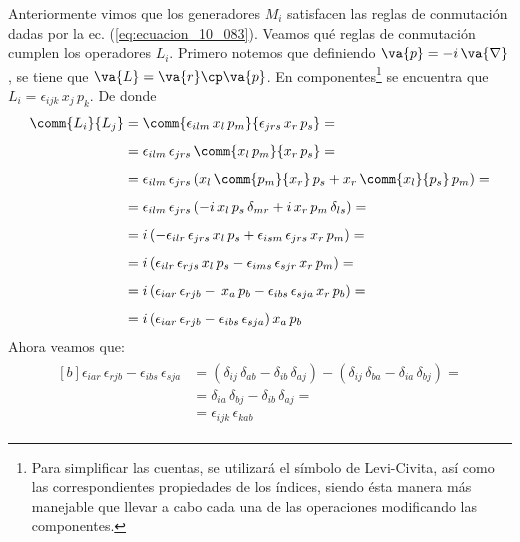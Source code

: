Anteriormente vimos que los generadores $M_{i}$ satisfacen las reglas de conmutación dadas por la ec. (\ref{eq:ecuacion_10_083}). Veamos qué reglas de conmutación cumplen los operadores $L_{i}$. Primero notemos que definiendo $\va{p} = - i \, \va{\nabla}$, se tiene que $\va{L} = \va{r} \cp \va{p}$. En componentes\footnote{Para simplificar las cuentas, se utilizará el símbolo de Levi-Civita, así como las correspondientes propiedades de los índices, siendo ésta manera más manejable que llevar a cabo cada una de las operaciones modificando las componentes.} se encuentra que $L_{i} = \epsilon_{ijk} \, x_{j} \, p_{k}$. De donde
\begin{align}
\begin{aligned}[b]
\comm{L_{i}}{L_{j}} &= \comm{\epsilon_{ilm} \, x_{l} \, p_{m}}{\epsilon_{jrs} \, x_{r} \, p_{s}} = \\[0.5em]
&= \epsilon_{ilm} \, \epsilon_{jrs} \, \comm{x_{l} \, p_{m}}{x_{r} \, p_{s}} = \\[0.5em]
&= \epsilon_{ilm} \, \epsilon_{jrs} \, (x_{l} \, \comm{p_{m}}{x_{r}} \, p_{s} + x_{r} \, \comm{x_{l}}{p_{s}} \, p_{m}) = \\[0.5em]
&= \epsilon_{ilm} \, \epsilon_{jrs} \, (- i \, x_{l} \, p_{s} \, \delta_{mr} + i \, x_{r} \, p_{m} \, \delta_{ls}) = \\[0.5em]
&= i \, (- \epsilon_{ilr} \, \epsilon_{jrs} \, x_{l} \, p_{s} + \epsilon_{ism} \, \epsilon_{jrs} \, x_{r} \, p_{m}) = \\[0.5em]
&= i \, (\epsilon_{ilr} \, \epsilon_{rjs} \, x_{l} \, p_{s} - \epsilon_{ims} \, \epsilon_{sjr} \, x_{r} \, p_{m}) = \\[0.5em]
&= i \, (\epsilon_{iar} \, \epsilon_{rjb} - \, x_{a} \, p_{b} - \epsilon_{ibs} \, \epsilon_{sja} \, x_{r} \, p_{b}) = \\[0.5em]
&= i \, (\epsilon_{iar} \, \epsilon_{rjb} - \epsilon_{ibs} \, \epsilon_{sja}) \, x_{a} \, p_{b}
\end{aligned}
\label{eq:ecuacion_10_103}
\end{align}
Ahora veamos que:
\begin{align}
\begin{aligned}[b]
\epsilon_{iar} \, \epsilon_{rjb} - \epsilon_{ibs} \, \epsilon_{sja} &= (\delta_{ij} \, \delta_{ab} - \delta_{ib} \, \delta_{aj}) - (\delta_{ij} \, \delta_{ba} - \delta_{ia} \, \delta_{bj}) = \\[0.5em]
&= \delta_{ia} \, \delta_{bj} - \delta_{ib} \, \delta_{aj} = \\[0.5em]
&= \epsilon_{ijk} \, \epsilon_{kab}
\end{aligned}
\label{eq:ecuacion_10_104}
\end{align}
